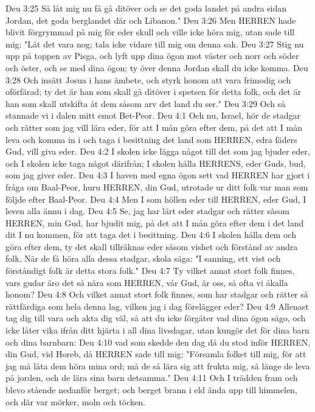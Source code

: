 Deu 3:25  Så låt mig nu få gå ditöver och se det goda landet på andra sidan Jordan, det goda berglandet där och Libanon."
Deu 3:26  Men HERREN hade blivit förgrymmad på mig för eder skull och ville icke höra mig, utan sade till mig: "Låt det vara nog; tala icke vidare till mig om denna sak.
Deu 3:27  Stig nu upp på toppen av Pisga, och lyft upp dina ögon mot väster och norr och söder och öster, och se med dina ögon; ty över denna Jordan skall du icke komma.
Deu 3:28  Och insätt Josua i hans ämbete, och styrk honom att vara frimodig och oförfärad; ty det är han som skall gå ditöver i spetsen för detta folk, och det är han som skall utskifta åt dem såsom arv det land du ser."
Deu 3:29  Och så stannade vi i dalen mitt emot Bet-Peor.
Deu 4:1  Och nu, Israel, hör de stadgar och rätter som jag vill lära eder, för att I mån göra efter dem, på det att I mån leva och komma in i och taga i besittning det land som HERREN, edra fäders Gud, vill giva eder.
Deu 4:2  I skolen icke lägga något till det som jag bjuder eder, och I skolen icke taga något därifrån; I skolen hålla HERRENS, eder Guds, bud, som jag giver eder.
Deu 4:3  I haven med egna ögon sett vad HERREN har gjort i fråga om Baal-Peor, huru HERREN, din Gud, utrotade ur ditt folk var man som följde efter Baal-Peor.
Deu 4:4  Men I som höllen eder till HERREN, eder Gud, I leven alla ännu i dag.
Deu 4:5  Se, jag har lärt eder stadgar och rätter såsom HERREN, min Gud, har bjudit mig, på det att I mån göra efter dem i det land dit I nu kommen, för att taga det i besittning.
Deu 4:6  I skolen hålla dem och göra efter dem, ty det skall tillräknas eder såsom vishet och förstånd av andra folk. När de få höra alla dessa stadgar, skola säga: "I sanning, ett vist och förståndigt folk är detta stora folk."
Deu 4:7  Ty vilket annat stort folk finnes, vars gudar äro det så nära som HERREN, vår Gud, är oss, så ofta vi åkalla honom?
Deu 4:8  Och vilket annat stort folk finnes, som har stadgar och rätter så rättfärdiga som hela denna lag, vilken jag i dag förelägger eder?
Deu 4:9  Allenast tag dig till vara och akta dig väl, så att du icke förgäter vad dina ögon sågo, och icke låter vika ifrån ditt hjärta i all dina livsdagar, utan kungör det för dina barn och dina barnbarn:
Deu 4:10  vad som skedde den dag då du stod inför HERREN, din Gud, vid Horeb, då HERREN sade till mig: "Församla folket till mig, för att jag må låta dem höra mina ord; må de så lära sig att frukta mig, så länge de leva på jorden, och de lära sina barn detsamma."
Deu 4:11  Och I trädden fram och blevo stående nedanför berget; och berget brann i eld ända upp till himmelen, och där var mörker, moln och töcken.
